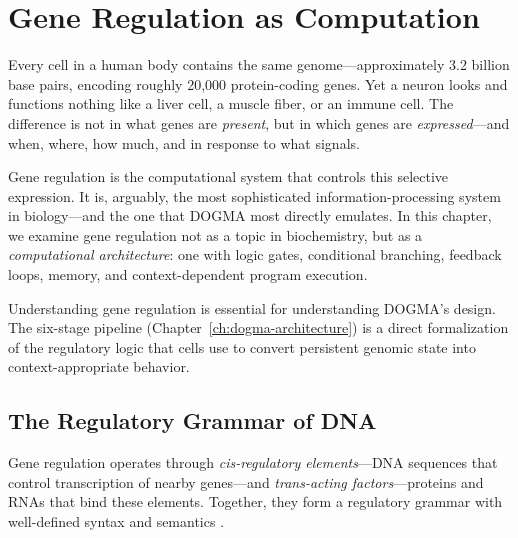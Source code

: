 
\chapter{Gene Regulation as Computation}
\label{ch:gene-regulation}


\noindent
Every cell in a human body contains the same genome---approximately 3.2 billion base pairs, encoding roughly 20,000 protein-coding genes. Yet a neuron looks and functions nothing like a liver cell, a muscle fiber, or an immune cell. The difference is not in what genes are \emph{present}, but in which genes are \emph{expressed}---and when, where, how much, and in response to what signals.

Gene regulation is the computational system that controls this selective expression. It is, arguably, the most sophisticated information-processing system in biology---and the one that DOGMA most directly emulates. In this chapter, we examine gene regulation not as a topic in biochemistry, but as a \emph{computational architecture}: one with logic gates, conditional branching, feedback loops, memory, and context-dependent program execution.

Understanding gene regulation is essential for understanding DOGMA's design. The six-stage pipeline (Chapter~\ref{ch:dogma-architecture}) is a direct formalization of the regulatory logic that cells use to convert persistent genomic state into context-appropriate behavior.

\section{The Regulatory Grammar of DNA}
\label{sec:regulatory-grammar}

Gene regulation operates through \emph{cis-regulatory elements}---DNA sequences that control transcription of nearby genes---and \emph{trans-acting factors}---proteins and RNAs that bind these elements. Together, they form a regulatory grammar with well-defined syntax and semantics \citep{alberts2022, encode2012}.

